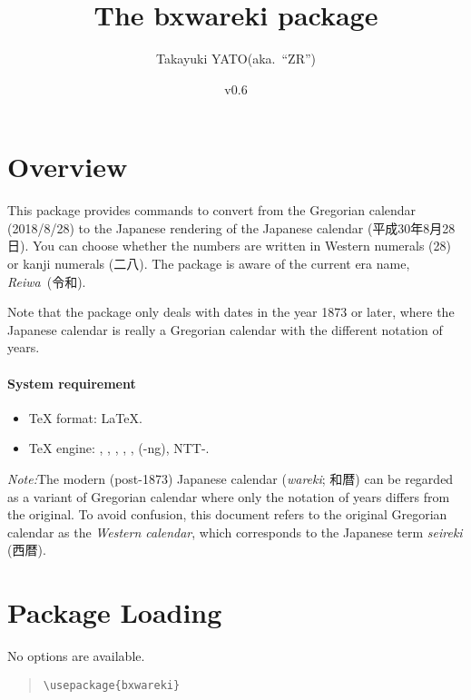 \documentclass[a4paper]{article}
\newcommand{\PkgVersion}{0.6}
\newcommand{\PkgDate}{2019/06/01}
\newcommand{\Pkg}[1]{\textsf{#1}}
\newcommand{\Note}{\par\noindent\emph{Note:}\quad}
\newcommand*{\Ja}[1]{{\fIpaex#1}}
\newcommand*{\+}{\hspace{0.25em minus 0.25em}}
\begin{document}
\title{The \Pkg{bxwareki} package}
\author{Takayuki YATO\quad (aka.~``ZR'')}
\date{v\PkgVersion \quad[\PkgDate]}
\maketitle

\section{Overview}
\label{sec:Overview}

This package provides commands to convert from the Gregorian calendar
(2018/8/28) to the Japanese rendering of the Japanese calendar
(\Ja{平成\+30\+年\+8\+月\+28\+日}).
You can choose whether the numbers are written
in Western numerals (28) or kanji numerals (\Ja{二八}).
The package is aware of the current era name,
\emph{Reiwa}~(\Ja{令和}).

Note that the package only deals with dates in the year 1873 or later,
where the Japanese calendar is really a Gregorian calendar
with the different notation of years.

\paragraph{System requirement}

\begin{itemize}
\item \TeX{} format: \LaTeX.
\item \TeX{} engine: {\pdfTeX}, {\LuaTeX}, {\XeTeX},
  {\pTeX}, {\upTeX}, {\ApTeX} ({\pTeX}-ng), NTT-{\JTeX}.
\end{itemize}

\Note The modern (post-1873) Japanese calendar (\emph{wareki}; \Ja{和暦})
can be regarded as a variant of Gregorian calendar
where only the notation of years differs from the original.
To avoid confusion, this document refers to the original Gregorian
calendar as the \emph{Western calendar},
which corresponds to the Japanese term \emph{seireki} (\Ja{西暦}).

\section{Package Loading}
\label{sec:Loading}

No options are available.

\begin{quote}\small\begin{verbatim}
\usepackage{bxwareki}
\end{verbatim}\end{quote}
\end{document}
